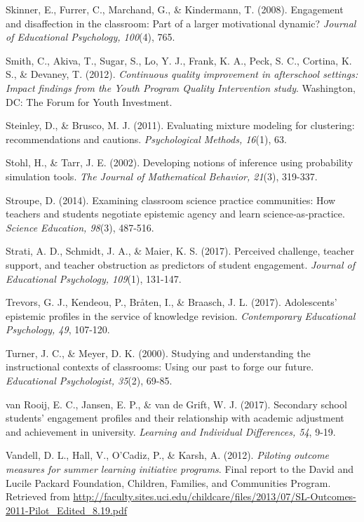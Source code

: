 \documentclass[]{msu-thesis}
\theoremstyle{definition}
\theoremstyle{definition}
\theoremstyle{definition}
\theoremstyle{remark}
\begin{document}
Skinner, E., Furrer, C., Marchand, G., \& Kindermann, T. (2008).
Engagement and disaffection in the classroom: Part of a larger
motivational dynamic? \emph{Journal of Educational Psychology, 100}(4),
765.

Smith, C., Akiva, T., Sugar, S., Lo, Y. J., Frank, K. A., Peck, S. C.,
Cortina, K. S., \& Devaney, T. (2012). \emph{Continuous quality
improvement in afterschool settings: Impact findings from the Youth
Program Quality Intervention study}. Washington, DC: The Forum for Youth
Investment.

Steinley, D., \& Brusco, M. J. (2011). Evaluating mixture modeling for
clustering: recommendations and cautions. \emph{Psychological Methods,
16}(1), 63.

Stohl, H., \& Tarr, J. E. (2002). Developing notions of inference using
probability simulation tools. \emph{The Journal of Mathematical
Behavior, 21}(3), 319-337.

Stroupe, D. (2014). Examining classroom science practice communities:
How teachers and students negotiate epistemic agency and learn
science‐as‐practice. \emph{Science Education, 98}(3), 487-516.

Strati, A. D., Schmidt, J. A., \& Maier, K. S. (2017). Perceived
challenge, teacher support, and teacher obstruction as predictors of
student engagement. \emph{Journal of Educational Psychology, 109}(1),
131-147.

Trevors, G. J., Kendeou, P., Bråten, I., \& Braasch, J. L. (2017).
Adolescents' epistemic profiles in the service of knowledge revision.
\emph{Contemporary Educational Psychology, 49}, 107-120.

Turner, J. C., \& Meyer, D. K. (2000). Studying and understanding the
instructional contexts of classrooms: Using our past to forge our
future. \emph{Educational Psychologist, 35}(2), 69-85.

van Rooij, E. C., Jansen, E. P., \& van de Grift, W. J. (2017).
Secondary school students' engagement profiles and their relationship
with academic adjustment and achievement in university. \emph{Learning
and Individual Differences, 54}, 9-19.

Vandell, D. L., Hall, V., O'Cadiz, P., \& Karsh, A. (2012).
\emph{Piloting outcome measures for summer learning initiative
programs}. Final report to the David and Lucile Packard Foundation,
Children, Families, and Communities Program. Retrieved from
\url{http://faculty.sites.uci.edu/childcare/files/2013/07/SL-Outcomes-2011-Pilot_Edited_8.19.pdf}
\end{document}
